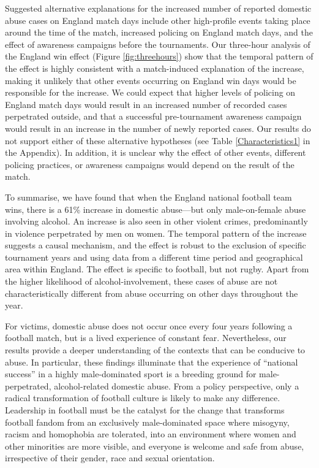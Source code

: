 \documentclass[12pt, letterpaper]{article}
\begin{document}
Suggested alternative explanations for the increased number of reported domestic abuse cases on England match days include other high-profile events taking place around the time of the match, increased policing on England match days, and the effect of awareness campaigns before the tournaments\autocite{Brooks-Hay2018}. Our three-hour analysis of the England win effect (Figure \ref{fig:threehours}) show that the temporal pattern of the effect is highly consistent with a match-induced explanation of the increase, making it unlikely that other events occurring on England win days would be responsible for the increase. We could expect that higher levels of policing on England match days would result in an increased number of recorded cases perpetrated outside, and that a successful pre-tournament awareness campaign would result in an increase in the number of newly reported cases. Our results do not support either of these alternative hypotheses (see Table \ref{Characteristics1} in the Appendix). In addition, it is unclear why the effect of other events, different policing practices, or awareness campaigns would depend on the result of the match. 


To summarise, we have found that when the England national football team wins, there is a 61\% increase in domestic abuse---but only male-on-female abuse involving alcohol. An increase is also seen in other violent crimes, predominantly in violence perpetrated by men on women. The temporal pattern of the increase suggests a causal mechanism, and the effect is robust to the exclusion of specific tournament years and using data from a different time period and geographical area within England. The effect is specific to football, but not rugby. Apart from the higher likelihood of alcohol-involvement, these cases of abuse are not characteristically different from abuse occurring on other days throughout the year. 

For victims, domestic abuse does not occur once every four years following a football match, but is a lived experience of constant fear. Nevertheless, our results provide a deeper understanding of the contexts that can be conducive to abuse. In particular, these findings illuminate that the experience of ``national success'' in a highly male-dominated sport is a breeding ground for male-perpetrated, alcohol-related domestic abuse. From a policy perspective, only a radical transformation of football culture is likely to make any difference\autocite{Swallow}. Leadership in football must be the catalyst for the change that transforms football fandom from an exclusively male-dominated space where misogyny, racism and homophobia are tolerated, into an environment where women and other minorities are more visible, and everyone is welcome and safe from abuse, irrespective of their gender, race and sexual orientation. 
\end{document}
